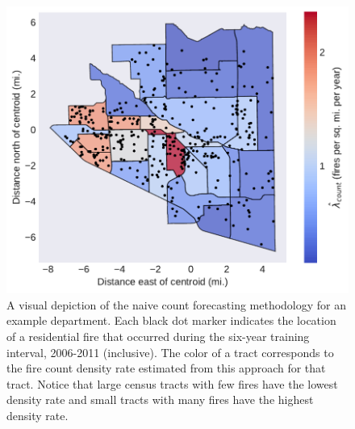 \documentclass{article}
\begin{document}
\begin{figure}[htbp] \centering
\includegraphics[width=.75\textwidth]{./figures/spatial_histogram.pdf}
\caption{A visual depiction of the naive count forecasting methodology for an example department. Each black dot marker indicates the location of a residential fire that occurred during the six-year training interval, 2006-2011 (inclusive). The color of a tract corresponds to the fire count density rate estimated from this approach for that tract. Notice that large census tracts with few fires have the lowest density rate and small tracts with many fires have the highest density rate.}
\label{fig:spatial_histogram}
\end{figure}








\clearpage


\end{document}

